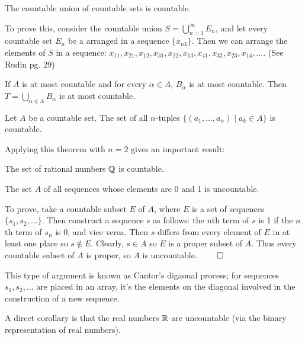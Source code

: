 \documentclass{article}
\begin{document}
\begin{theorem}
    The countable union of countable sets is countable.
\end{theorem}
\begin{remark}
    To prove this, consider the countable union $S=\bigcup_{n=1}^{\infty}E_{n}$, and let every countable set $E_{n}$ be a arranged in a sequence $\{x_{nk}\}$. Then we can arrange the elements of $S$ in a sequence: $x_{11},x_{21},x_{12},x_{31},x_{22},x_{13},x_{41},x_{32},x_{23},x_{14},\dotsc$. (See Rudin pg. 29) 
\end{remark}
\begin{corollary}
    If $A$ is at most countable and for every $\alpha \in A$, $B_{\alpha}$ is at most countable. Then $T=\bigcup_{\alpha\in A}B_{\alpha}$ is at most countable.
\end{corollary}
\begin{theorem}
    Let $A$ be a countable set. The set of all $n$-tuples $\{(a_{1},\dotsc,a_{n})\mid a_{k}\in A\}$ is countable.
\end{theorem}
Applying this theorem with $n=2$ gives an important result:
\begin{corollary}
    The set of rational numbers $\mathbb Q$ is countable.
\end{corollary}
\begin{theorem}
    The set $A$ of all sequences whose elements are 0 and 1 is uncountable.
\end{theorem}
\begin{remark}
    To prove, take a countable subset $E$ of $A$, where $E$ is a set of sequences $\{s_{1},s_{2},\dotsc\}$. Then construct a sequence $s$ as follows: the $n$th term of $s$ is 1 if the $n$th term of $s_{n}$ is 0, and vice versa. Then $s$ differs from every element of $E$ in at least one place so $s\not\in E$. Clearly, $s\in A$ so $E$ is a proper subset of $A$. Thus every countable subset of $A$ is proper, so $A$ is uncountable. $\qed$ 
    
    This type of argument is known as Cantor's digaonal process; for sequences $s_{1},s_{2},\dotsc$  are placed in an array, it's the elements on the diagonal involved in the construction of a new sequence.

    A direct corollary is that the real numbers $\mathbb R$ are uncountable (via the binary representation of real numbers).
\end{remark}
\end{document}
